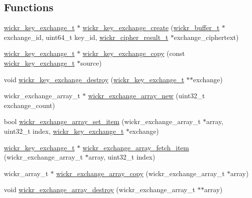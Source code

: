 \subsection*{Functions}
\begin{DoxyCompactItemize}
\item 
\mbox{\hyperlink{structwickr__key__exchange}{wickr\+\_\+key\+\_\+exchange\+\_\+t}} $\ast$ \mbox{\hyperlink{group__wickr__key__exchange_ga1b6944bcbf28bae1312189d44628de3c}{wickr\+\_\+key\+\_\+exchange\+\_\+create}} (\mbox{\hyperlink{structwickr__buffer}{wickr\+\_\+buffer\+\_\+t}} $\ast$exchange\+\_\+id, uint64\+\_\+t key\+\_\+id, \mbox{\hyperlink{structwickr__cipher__result}{wickr\+\_\+cipher\+\_\+result\+\_\+t}} $\ast$exchange\+\_\+ciphertext)
\item 
\mbox{\hyperlink{structwickr__key__exchange}{wickr\+\_\+key\+\_\+exchange\+\_\+t}} $\ast$ \mbox{\hyperlink{group__wickr__key__exchange_ga2235a7c168e3806aa1a71b5a5c8dee48}{wickr\+\_\+key\+\_\+exchange\+\_\+copy}} (const \mbox{\hyperlink{structwickr__key__exchange}{wickr\+\_\+key\+\_\+exchange\+\_\+t}} $\ast$source)
\item 
void \mbox{\hyperlink{group__wickr__key__exchange_ga54b6481f8f4b61fb949bec17d47cd3de}{wickr\+\_\+key\+\_\+exchange\+\_\+destroy}} (\mbox{\hyperlink{structwickr__key__exchange}{wickr\+\_\+key\+\_\+exchange\+\_\+t}} $\ast$$\ast$exchange)
\item 
wickr\+\_\+exchange\+\_\+array\+\_\+t $\ast$ \mbox{\hyperlink{group__wickr__key__exchange_ga907d700b76b748f80796b4404c7172c2}{wickr\+\_\+exchange\+\_\+array\+\_\+new}} (uint32\+\_\+t exchange\+\_\+count)
\item 
bool \mbox{\hyperlink{group__wickr__key__exchange_gad3c6687c07ae5e66efcbc55da0febd85}{wickr\+\_\+exchange\+\_\+array\+\_\+set\+\_\+item}} (wickr\+\_\+exchange\+\_\+array\+\_\+t $\ast$array, uint32\+\_\+t index, \mbox{\hyperlink{structwickr__key__exchange}{wickr\+\_\+key\+\_\+exchange\+\_\+t}} $\ast$exchange)
\item 
\mbox{\hyperlink{structwickr__key__exchange}{wickr\+\_\+key\+\_\+exchange\+\_\+t}} $\ast$ \mbox{\hyperlink{group__wickr__key__exchange_ga333510c3c7eeb8e33f94495de6bb122d}{wickr\+\_\+exchange\+\_\+array\+\_\+fetch\+\_\+item}} (wickr\+\_\+exchange\+\_\+array\+\_\+t $\ast$array, uint32\+\_\+t index)
\item 
wickr\+\_\+array\+\_\+t $\ast$ \mbox{\hyperlink{group__wickr__key__exchange_gacd04405337871aa3bcd550a051d778e1}{wickr\+\_\+exchange\+\_\+array\+\_\+copy}} (wickr\+\_\+exchange\+\_\+array\+\_\+t $\ast$array)
\item 
void \mbox{\hyperlink{group__wickr__key__exchange_gadc1e5f5836bc09c1d6b8d6203d02a0eb}{wickr\+\_\+exchange\+\_\+array\+\_\+destroy}} (wickr\+\_\+exchange\+\_\+array\+\_\+t $\ast$$\ast$array)
\end{DoxyCompactItemize}


